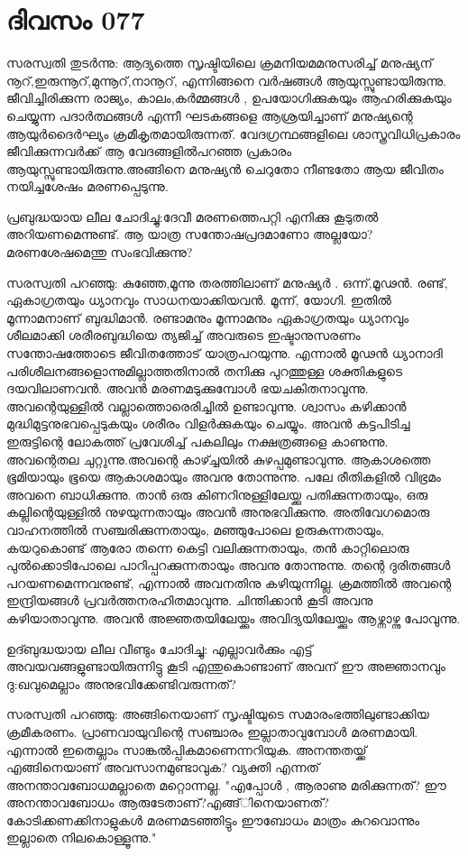  
\section{ദിവസം 077}


സരസ്വതി തുടര്‍ന്നു: ആദ്യത്തെ സൃഷ്ടിയിലെ ക്രമനിയമമനുസരിച്ച്‌ മനുഷ്യന്‌ നൂറ്‌,ഇരുന്നൂറ്‌,മുന്നൂറ്‌,നാനൂറ്‌, എന്നിങ്ങനെ വര്‍ഷങ്ങള്‍ ആയുസ്സുണ്ടായിരുന്നു. ജീവിച്ചിരിക്കുന്ന രാജ്യം, കാലം,കര്‍മ്മങ്ങള്‍ , ഉപയോഗിക്കുകയും ആഹരിക്കുകയും ചെയ്യുന്ന പദാര്‍ത്ഥങ്ങള്‍ എന്നീ ഘടകങ്ങളെ ആശ്രയിച്ചാണ്‌ മനുഷ്യന്റെ ആയുര്‍ദൈര്‍ഘ്യം ക്രമീകൃതമായിരുന്നത്‌. വേദഗ്രന്ഥങ്ങളിലെ ശാസ്ത്രവിധിപ്രകാരം ജീവിക്കുന്നവര്‍ക്ക്‌ ആ വേദങ്ങളില്‍പറഞ്ഞ പ്രകാരം ആയുസ്സുണ്ടായിരുന്നു.അങ്ങിനെ മനുഷ്യന്‍ ചെറുതോ നീണ്ടതോ ആയ ജീവിതം നയിച്ചശേഷം മരണപ്പെടുന്നു.

പ്രബുദ്ധയായ ലീല ചോദിച്ചു:ദേവീ മരണത്തെപറ്റി എനിക്കു കൂടുതല്‍ അറിയണമെന്നുണ്ട്‌. ആ യാത്ര സന്തോഷപ്രദമാണോ അല്ലയോ? മരണശേഷമെന്തു സംഭവിക്കുന്നു?

സരസ്വതി പറഞ്ഞു: കുഞ്ഞേ,മൂന്നു തരത്തിലാണ്‌ മനുഷ്യര്‍ . ഒന്ന്,മൂഢന്‍. രണ്ട്‌, ഏകാഗ്രതയും ധ്യാനവും സാധനയാക്കിയവന്‍. മൂന്ന്, യോഗി. ഇതില്‍ മൂന്നാമനാണ്‌ ബുദ്ധിമാന്‍. രണ്ടാമനും മൂന്നാമനും ഏകാഗ്രതയും ധ്യാനവും ശീലമാക്കി ശരീരബുദ്ധിയെ ത്യജിച്ച്‌ അവരുടെ ഇഷ്ടാനുസരണം സന്തോഷത്തോടെ ജീവിതത്തോട്‌ യാത്രപറയുന്നു. എന്നാല്‍ മൂഢന്‍ ധ്യാനാദി   പരിശീലനങ്ങളൊന്നുമില്ലാത്തതിനാല്‍ തനിക്കു പുറത്തുള്ള ശക്തികളുടെ ദയവിലാണവന്‍. അവന്‍ മരണമടുക്കുമ്പോള്‍ ഭയചകിതനാവുന്നു. അവന്റെയുള്ളില്‍ വല്ലാത്തൊരെരിച്ചില്‍ ഉണ്ടാവുന്നു. ശ്വാസം കഴിക്കാന്‍ മുദ്ധിമുട്ടനുഭവപ്പെടുകയും ശരീരം വിളര്‍ക്കുകയും ചെയ്യും. അവന്‍ കട്ടപിടിച്ച ഇരുട്ടിന്റെ ലോകത്ത്‌ പ്രവേശിച്ച്‌ പകലിലും നക്ഷത്രങ്ങളെ കാണുന്നു. അവന്റെതല ചുറ്റുന്നു.അവന്റെ കാഴ്ച്ചയില്‍ കുഴപ്പമുണ്ടാവുന്നു. ആകാശത്തെ ഭൂമിയായും ഭൂയെ ആകാശമായും അവനു തോന്നുന്നു. പലേ രീതികളില്‍ വിഭ്രമം അവനെ ബാധിക്കുന്നു. താന്‍ ഒരു കിണറിനുള്ളിലേയ്ക്കു പതിക്കുന്നതായും, ഒരു കല്ലിന്റെയുള്ളില്‍ നുഴയുന്നതായും അവന്‍ അനുഭവിക്കുന്നു. അതിവേഗമൊരു വാഹനത്തില്‍ സഞ്ചരിക്കുന്നതായും, മഞ്ഞുപോലെ ഉരുകുന്നതായും, കയറുകൊണ്ട്‌ ആരോ തന്നെ കെട്ടി വലിക്കുന്നതായും, തന്‍ കാറ്റിലൊരു പുല്‍ക്കൊടിപോലെ പാറിപ്പറക്കുന്നതായും അവനു തോന്നുന്നു. തന്റെ ദുരിതങ്ങള്‍ പറയണമെന്നവനുണ്ട്‌, എന്നാല്‍ അവനതിനു കഴിയുന്നില്ല. ക്രമത്തില്‍ അവന്റെ ഇന്ദ്രിയങ്ങള്‍ പ്രവര്‍ത്തനരഹിതമാവുന്നു. ചിന്തിക്കാന്‍ കൂടി അവനു കഴിയാതാവുന്നു. അവന്‍ അജ്ഞതയിലേയ്ക്കും അവിദ്യയിലേയ്ക്കും ആഴ്ന്നാഴ്ന്നു പോവുന്നു.

ഉദ്ബുദ്ധയായ ലീല വീണ്ടും ചോദിച്ചു: എല്ലാവര്‍ക്കും എട്ട്‌ അവയവങ്ങളുണ്ടായിരുന്നിട്ടു കൂടി എന്തുകൊണ്ടാണ്‌ അവന്‌ ഈ അജ്ഞാനവും ദു:ഖവുമെല്ലാം അനുഭവിക്കേണ്ടിവരുന്നത്‌? 

സരസ്വതി പറഞ്ഞു: അങ്ങിനെയാണ്‌ സൃഷ്ടിയുടെ സമാരംഭത്തിലുണ്ടാക്കിയ ക്രമീകരണം. പ്രാണവായുവിന്റെ സഞ്ചാരം ഇല്ലാതാവുമ്പോള്‍ മരണമായി. എന്നാല്‍ ഇതെല്ലാം സാങ്കല്‍പ്പികമാണെന്നറിയുക. അനന്തതയ്ക്ക്‌ എങ്ങിനെയാണ്‌ അവസാനമുണ്ടാവുക? വ്യക്തി എന്നത്‌ അനന്താവബോധമല്ലാതെ മറ്റൊന്നല്ല. "എപ്പോള്‍ , ആരാണു മരിക്കുന്നത്‌? ഈ അനന്താവബോധം ആരുടേതാണ്‌?എങ്ങ്‌ിനെയാണത്‌? കോടിക്കണക്കിനാളുകള്‍ മരണമടഞ്ഞിട്ടും ഈബോധം മാത്രം കുറവൊന്നും ഇല്ലാതെ നിലകൊള്ളൂന്നു."
